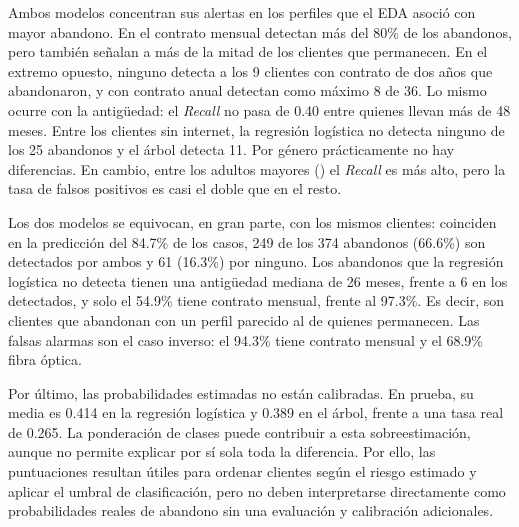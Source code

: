 Ambos modelos concentran sus alertas en los perfiles que el EDA asoció con mayor abandono. En el
contrato mensual detectan más del 80\% de los abandonos, pero también señalan a más de la mitad de
los clientes que permanecen. En el extremo opuesto, ninguno detecta a los 9 clientes con contrato de
dos años que abandonaron, y con contrato anual detectan como máximo 8 de 36. Lo mismo ocurre con la
antigüedad: el \emph{Recall} no pasa de 0.40 entre quienes llevan más de 48 meses. Entre los
clientes sin internet, la regresión logística no detecta ninguno de los 25 abandonos y el árbol
detecta 11. Por género prácticamente no hay diferencias. En cambio, entre los adultos mayores
() el \emph{Recall} es más alto, pero la tasa de falsos positivos es
casi el doble que en el resto.

Los dos modelos se equivocan, en gran parte, con los mismos clientes: coinciden en la predicción del
84.7\% de los casos, 249 de los 374 abandonos (66.6\%) son detectados por ambos y 61 (16.3\%) por
ninguno. Los abandonos que la regresión logística no detecta tienen una antigüedad mediana de 26
meses, frente a 6 en los detectados, y solo el 54.9\% tiene contrato mensual, frente al 97.3\%. Es
decir, son clientes que abandonan con un perfil parecido al de quienes permanecen. Las falsas alarmas
son el caso inverso: el 94.3\% tiene contrato mensual y el 68.9\% fibra óptica.

Por último, las probabilidades estimadas no están calibradas. En prueba, su media es 0.414 en la
regresión logística y 0.389 en el árbol, frente a una tasa real de 0.265.
La ponderación de clases puede contribuir a esta sobreestimación, aunque no permite explicar por sí
sola toda la diferencia. Por ello, las puntuaciones resultan útiles para ordenar clientes según el
riesgo estimado y aplicar el umbral de clasificación, pero no deben interpretarse directamente como
probabilidades reales de abandono sin una evaluación y calibración adicionales.
